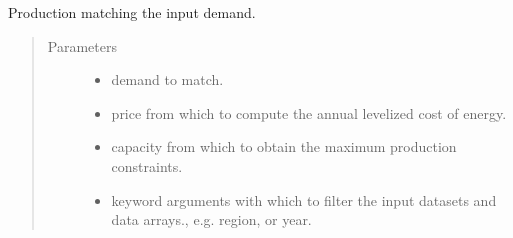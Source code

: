 \documentclass[letterpaper,10pt,english]{sphinxmanual}
\begin{document}
\begin{fulllineitems}
\label{\detokenize{api:muse.quantities.demand_matched_production}}
Production matching the input demand.
\begin{quote}\begin{description}
\item[{Parameters}] \leavevmode\begin{itemize}
\item {} 
 \textendash{} demand to match.

\item {} 
 \textendash{} price from which to compute the annual levelized cost of energy.

\item {} 
 \textendash{} capacity from which to obtain the maximum production constraints.

\item {} 
 \textendash{} keyword arguments with which to filter the input datasets and
data arrays., e.g. region, or year.

\end{itemize}

\end{description}\end{quote}

\end{fulllineitems}

\end{document}
